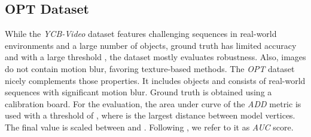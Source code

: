 \documentclass[10pt,twocolumn,letterpaper]{article}
\begin{document}
\subsection{OPT Dataset}\label{ssec:e1}
While the \textit{YCB-Video} dataset features challenging sequences in real-world environments and a large number of objects, ground truth has limited accuracy and with a large threshold , the dataset mostly evaluates robustness.
Also, images do not contain motion blur, favoring texture-based methods.
The \textit{OPT} dataset \cite{Wu2017} nicely complements those properties.
It includes  objects and consists of  real-world sequences with significant motion blur.
Ground truth is obtained using a calibration board.
For the evaluation, the area under curve of the \textit{ADD} metric is used with a threshold of , where  is the largest distance between model vertices.
The final value is scaled between  and .
Following \cite{Wu2017}, we refer to it as \textit{AUC} score.
\end{document}
